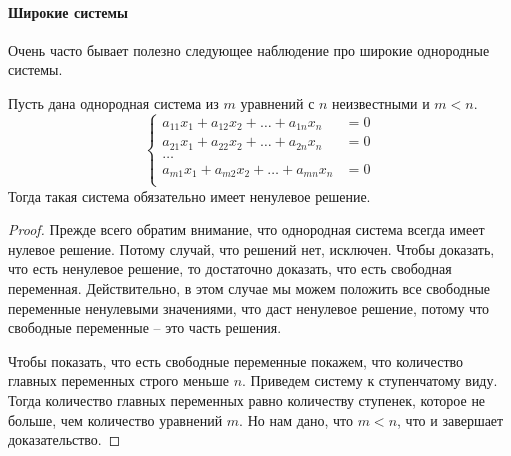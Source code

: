 \paragraph{Широкие системы}

Очень часто бывает полезно следующее наблюдение про широкие однородные системы.

\begin{claim}
\label{claim::WideSystems}
Пусть дана однородная система из $m$ уравнений с $n$ неизвестными и $m < n$.
\[
\left\{
\begin{aligned}
a_{11} x_1 + a_{12} x_2 + \ldots + a_{1n} x_n &= 0\\
a_{21} x_1 + a_{22} x_2 + \ldots + a_{2n} x_n &= 0\\
\ldots &\\
a_{m1} x_1 + a_{m2} x_2 + \ldots + a_{mn} x_n &= 0\\
\end{aligned}
\right.
\]
Тогда такая система обязательно имеет ненулевое решение.
\end{claim}
\begin{proof}
Прежде всего обратим внимание, что однородная система всегда имеет нулевое решение.
Потому случай, что решений нет, исключен.
Чтобы доказать, что есть ненулевое решение, то достаточно доказать, что есть свободная переменная.
Действительно, в этом случае мы можем положить все свободные переменные ненулевыми значениями, что даст ненулевое решение, потому что свободные переменные -- это часть решения.

Чтобы показать, что есть свободные переменные покажем, что количество главных переменных строго меньше $n$.
Приведем систему к ступенчатому виду.
Тогда количество главных переменных равно количеству ступенек, которое не больше, чем количество уравнений $m$.
Но нам дано, что $m < n$, что и завершает доказательство.
\end{proof}

